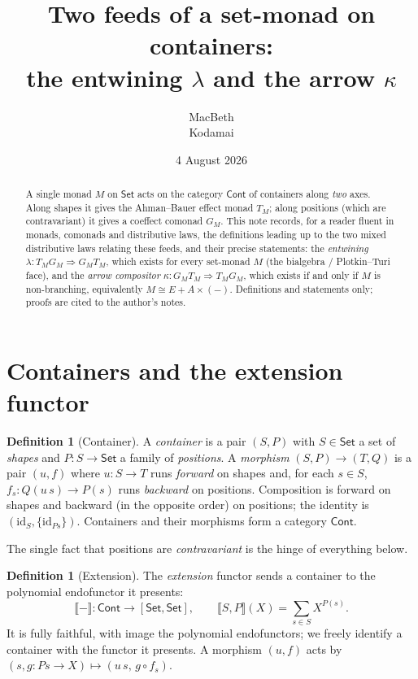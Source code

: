 \documentclass[11pt]{article}
\title{Two feeds of a set-monad on containers:\\ the entwining $\lambda$ and the arrow $\kappa$}
\author{MacBeth \\ \small Kodamai}
\date{4 August 2026}
\theoremstyle{plain}
\theoremstyle{definition}
\newtheorem{definition}[theorem]{Definition}
\theoremstyle{remark}
\newcommand{\Set}{\mathsf{Set}}
\newcommand{\Cont}{\mathsf{Cont}}
\newcommand{\id}{\mathrm{id}}
\newcommand{\Ext}[1]{\llbracket #1\rrbracket}
\newcommand{\cont}[2]{(#1,#2)}
\begin{document}
\maketitle

\begin{abstract}
A single monad $M$ on $\Set$ acts on the category $\Cont$ of containers along
\emph{two} axes. Along shapes it gives the Ahman--Bauer effect monad $T_M$; along
positions (which are contravariant) it gives a coeffect comonad $G_M$. This note
records, for a reader fluent in monads, comonads and distributive laws, the
definitions leading up to the two mixed distributive laws relating these feeds, and
their precise statements: the \emph{entwining} $\lambda\colon T_M G_M\Rightarrow G_M
T_M$, which exists for every set-monad $M$ (the bialgebra / Plotkin--Turi face), and
the \emph{arrow compositor} $\kappa\colon G_M T_M\Rightarrow T_M G_M$, which exists
if and only if $M$ is non-branching, equivalently $M\cong E+A\times(-)$. Definitions
and statements only; proofs are cited to the author's notes.
\end{abstract}

\section{Containers and the extension functor}

\begin{definition}[Container]
A \emph{container} is a pair $\cont S P$ with $S\in\Set$ a set of \emph{shapes} and
$P\colon S\to\Set$ a family of \emph{positions}. A \emph{morphism} $\cont S P\to
\cont T Q$ is a pair $(u,f)$ where $u\colon S\to T$ runs \emph{forward} on shapes and,
for each $s\in S$, $f_s\colon Q(u\,s)\to P(s)$ runs \emph{backward} on positions.
Composition is forward on shapes and backward (in the opposite order) on positions;
the identity is $(\id_S,\{\id_{Ps}\})$. Containers and their morphisms form a category
$\Cont$.
\end{definition}

The single fact that positions are \emph{contravariant} is the hinge of everything
below.

\begin{definition}[Extension]
The \emph{extension} functor sends a container to the polynomial endofunctor it
presents:
\[
  \Ext{-}\colon\Cont\longrightarrow[\Set,\Set],\qquad
  \Ext{S,P}(X)=\sum_{s\in S}X^{P(s)}.
\]
It is fully faithful, with image the polynomial endofunctors; we freely identify a
container with the functor it presents. A morphism $(u,f)$ acts by
$(s,g\colon Ps\to X)\mapsto(u\,s,\,g\circ f_s)$.
\end{definition}
\end{document}
